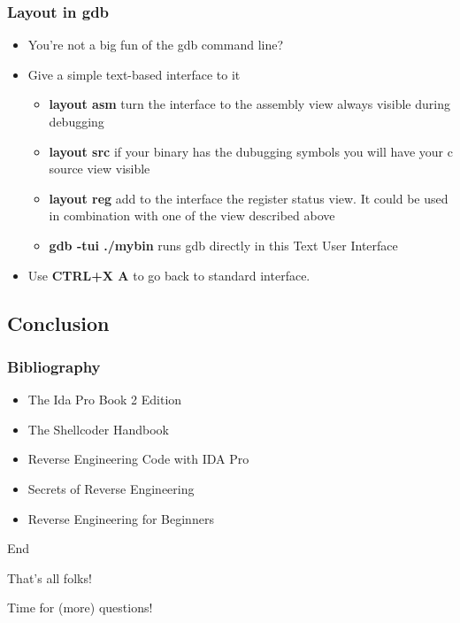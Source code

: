 \documentclass[]{beamer}
\begin{document}
\begin{frame}
  \frametitle{Layout in gdb}
  \begin{itemize}
  \item{You're not a big fun of the gdb command line?}
  \item{Give a simple text-based interface to it}
    \begin{itemize}
    \item{{\bf layout asm} turn the interface to the assembly view always visible during debugging}
    \item{{\bf layout src} if your binary has the dubugging symbols you will have your c source view visible}
    \item{{\bf layout reg} add to the interface the register status view. It could be used in combination with one of the view described above}
    \item{{\bf gdb -tui ./mybin} runs gdb directly in this Text User Interface}
    \end{itemize}
  \item{Use {\bf CTRL+X A} to go back to standard interface.}
  \end{itemize}
\end{frame}

\subsection{Conclusion}
\begin{frame}
  \frametitle{Bibliography}
  \begin{itemize}
  \item The Ida Pro Book 2 Edition
  \item The Shellcoder Handbook
  \item Reverse Engineering Code with IDA Pro
  \item Secrets of Reverse Engineering
  \item Reverse Engineering for Beginners
  \end{itemize}
\end{frame}

\begin{frame}{End}
  \begin{center}\Large
    That's all folks!

    Time for (more) questions!
  \end{center}
\end{frame}
\end{document}
